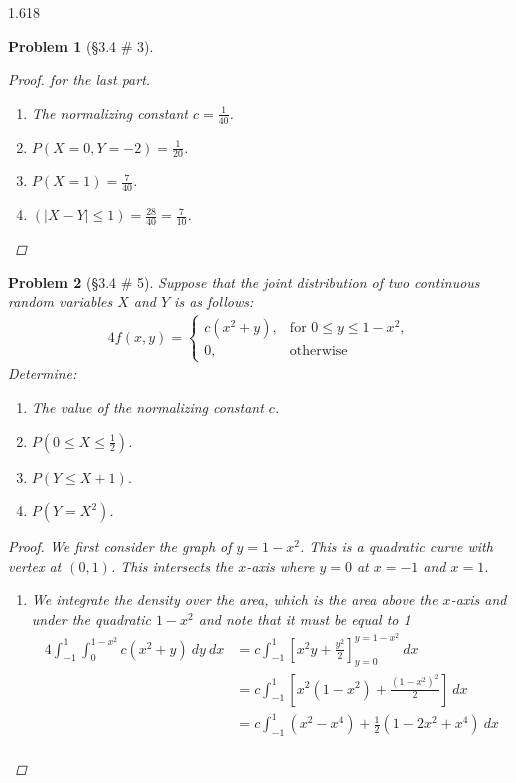 \documentclass[11pt, oneside]{book}   	%
\newtheorem{problem}{Problem}[section]
\begin{document}
\begin{spacing}{1.618}
\begin{problem}[\S 3.4 \# 3]
\begin{proof}
					for the last part. 


					\begin{enumerate}
						\item The normalizing constant $c=\frac{1}{40}$.
						\item $P(X=0, Y= -2) = \frac{1}{20}$. 
						\item $P(X=1) = \frac{7}{40}$. 
						\item $(|X - Y| \leq 1) = \frac{28}{40} = \frac{7}{10}$. 
					\end{enumerate}
				\end{proof}
			\end{problem}

			\begin{problem}[\S 3.4 \# 5]
				Suppose that the joint distribution of two continuous random variables $X$ and $Y$ is as follows:
				\begin{alignat}{4}
					f(x, y) = \begin{cases}
						c \left(x^2 + y\right),& \textrm{for } 0\leq y \leq 1-x^2, \\
						0,&\textrm{otherwise}
					\end{cases}
				\end{alignat}
				Determine:
				\begin{enumerate}
					\item The value of the normalizing constant $c$.
					\item $P\left(0\leq X \leq \frac{1}{2}\right)$.
					\item $P(Y\leq X + 1)$.
					\item $P\left(Y=X^2\right)$.
				\end{enumerate}
				\begin{proof}
					We first consider the graph of $y=1-x^2$. This is a quadratic curve with vertex at $(0, 1)$. This intersects the $x$-axis where $y=0$ at $x=-1$ and $x=1$.  
					\begin{enumerate}
						\item We integrate the density over the area, which is the area above the $x$-axis and under the quadratic $1-x^2$ and note that it must be equal to 1
							\begin{alignat}{4}
								\int_{-1}^1\int_{0}^{1-x^2} c\left(x^2+y\right)~dy~dx & = c \int_{-1}^1 \left[ x^2y + \frac{y^2}{2}\right]_{y=0}^{y=1-x^2} ~ dx \\
									&= c\int_{-1}^1\left[ x^2(1-x^2)+\frac{\left(1-x^2\right)^2}{2} \right] ~ dx \\
									&=c\int_{-1}^1 \left(x^2 - x^4\right) + \frac{1}{2}\left(1-2x^2+x^4\right)~dx \\

\end{alignat}
\end{enumerate}
\end{proof}
\end{problem}
\end{spacing}
\end{document}
